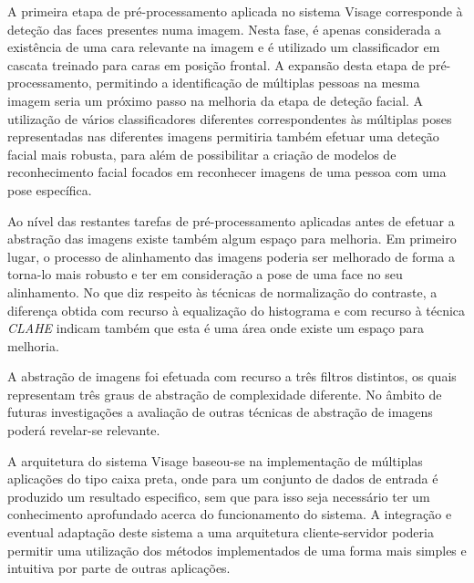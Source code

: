 A primeira etapa de pré-processamento aplicada no sistema Visage corresponde à deteção das faces presentes numa imagem. Nesta fase, é apenas considerada a existência de uma cara relevante na imagem e é utilizado um classificador em cascata treinado para caras em posição frontal. A expansão desta etapa de pré-processamento, permitindo a identificação de múltiplas pessoas na mesma imagem seria um próximo passo na melhoria da etapa de deteção facial. A utilização de vários classificadores diferentes correspondentes às múltiplas poses representadas nas diferentes imagens permitiria também efetuar uma deteção facial mais robusta, para além de possibilitar a criação de modelos de reconhecimento facial focados em reconhecer imagens de uma pessoa com uma pose específica.

Ao nível das restantes tarefas de pré-processamento aplicadas antes de efetuar a abstração das imagens existe também algum espaço para melhoria. Em primeiro lugar, o processo de alinhamento das imagens poderia ser melhorado de forma a torna-lo mais robusto e ter em consideração a pose de uma face no seu alinhamento. No que diz respeito às técnicas de normalização do contraste, a diferença obtida com recurso à equalização do histograma e com recurso à técnica \textit{CLAHE} indicam também que esta é uma área onde existe um espaço para melhoria.

A abstração de imagens foi efetuada com recurso a três filtros distintos, os quais representam três graus de abstração de complexidade diferente. No âmbito de futuras investigações a avaliação de outras técnicas de abstração de imagens poderá revelar-se relevante.

A arquitetura do sistema Visage baseou-se na implementação de múltiplas aplicações do tipo caixa preta, onde para um conjunto de dados de entrada é produzido um resultado especifico, sem que para isso seja necessário ter um conhecimento aprofundado acerca do funcionamento do sistema. A integração e eventual adaptação deste sistema a uma arquitetura cliente-servidor poderia permitir uma utilização dos métodos implementados de uma forma mais simples e intuitiva por parte de outras aplicações.


